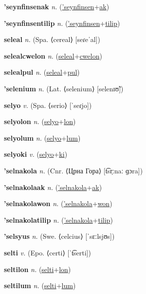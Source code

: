 \textbf{\hypertarget{'seynfinsenak}{'seynfinsenak}} \textit{n.} (\hyperlink{'seynfinsen}{'seynfinsen}+\allowbreak \hyperlink{ak}{ak})


\textbf{\hypertarget{'seynfinsentilip}{'seynfinsentilip}} \textit{n.} (\hyperlink{'seynfinsen}{'seynfinsen}+\allowbreak \hyperlink{tilip}{tilip})


\textbf{\hypertarget{seleal}{seleal}} \textit{n.} (Spa. ⟨cereal⟩ [seɾeˈal])


\textbf{\hypertarget{selealcwelon}{selealcwelon}} \textit{n.} (\hyperlink{seleal}{seleal}+\allowbreak \hyperlink{cwelon}{cwelon})


\textbf{\hypertarget{selealpul}{selealpul}} \textit{n.} (\hyperlink{seleal}{seleal}+\allowbreak \hyperlink{pul}{pul})


\textbf{\hypertarget{'selenium}{'selenium}} \textit{n.} (Lat. ⟨selenium⟩ [selenɪʊ̃])


\textbf{\hypertarget{selyo}{selyo}} \textit{v.} (Spa. ⟨serio⟩ [ˈseɾjo])


\textbf{\hypertarget{selyolon}{selyolon}} \textit{n.} (\hyperlink{selyo}{selyo}+\allowbreak \hyperlink{lon}{lon})


\textbf{\hypertarget{selyolum}{selyolum}} \textit{n.} (\hyperlink{selyo}{selyo}+\allowbreak \hyperlink{lum}{lum})


\textbf{\hypertarget{selyoki}{selyoki}} \textit{v.} (\hyperlink{selyo}{selyo}+\allowbreak \hyperlink{ki}{ki})


\textbf{\hypertarget{'selnakola}{'selnakola}} \textit{n.} (Cnr. ⟨Црна Гора⟩ [t͡sr̩ːnaː ɡɔra])


\textbf{\hypertarget{'selnakolaak}{'selnakolaak}} \textit{n.} (\hyperlink{'selnakola}{'selnakola}+\allowbreak \hyperlink{ak}{ak})


\textbf{\hypertarget{'selnakolawon}{'selnakolawon}} \textit{n.} (\hyperlink{'selnakola}{'selnakola}+\allowbreak \hyperlink{won}{won})


\textbf{\hypertarget{'selnakolatilip}{'selnakolatilip}} \textit{n.} (\hyperlink{'selnakola}{'selnakola}+\allowbreak \hyperlink{tilip}{tilip})


\textbf{\hypertarget{'selsyus}{'selsyus}} \textit{n.} (Swe. ⟨celcius⟩ [ˈsɛːlsjʊs])


\textbf{\hypertarget{selti}{selti}} \textit{v.} (Epo. ⟨certi⟩ [ˈt͡serti])


\textbf{\hypertarget{seltilon}{seltilon}} \textit{n.} (\hyperlink{selti}{selti}+\allowbreak \hyperlink{lon}{lon})


\textbf{\hypertarget{seltilum}{seltilum}} \textit{n.} (\hyperlink{selti}{selti}+\allowbreak \hyperlink{lum}{lum})


